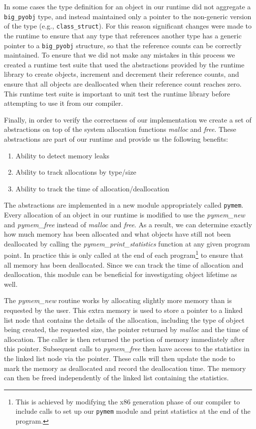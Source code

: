 \documentclass{sigplanconf}
\newcommand{\afunction}[1]{\textit{#1}}
\newcommand{\atype}[1]{\texttt{#1}}
\begin{document}
In some cases the type definition for an object in our runtime did not aggregate a \atype{big\_pyobj} type, and instead maintained only a pointer to the non-generic version of the type (e.g., \atype{class\_struct}).  For this reason significant changes were made to the runtime to ensure that any type that references another type has a generic pointer to a \atype{big\_pyobj} structure, so that the reference counts can be correctly maintained.  To ensure that we did not make any mistakes in this process we created a runtime test suite that used the abstractions provided by the runtime library to create objects, increment and decrement their reference counts, and ensure that all objects are deallocated when their reference count reaches zero.  This runtime test suite is important to unit test the runtime library before attempting to use it from our compiler.

Finally, in order to verify the correctness of our implementation we create a set of abstractions on top of the system allocation functions \afunction{malloc} and \afunction{free}.  These abstractions are part of our runtime and provide us the following benefits: 

\begin{enumerate}
\item Ability to detect memory leaks
\item Ability to track allocations by type/size
\item Ability to track the time of allocation/deallocation
\end{enumerate}

The abstractions are implemented in a new module appropriately called \texttt{pymem}.  Every allocation of an object in our runtime is modified to use the \afunction{pymem\_new} and \afunction{pymem\_free} instead of \afunction{malloc} and \afunction{free}. As a result, we can determine exactly how much memory has been allocated and what objects have still not been deallocated by calling the \afunction{pymem\_print\_statistics} function at any given program point.  In practice this is only called at the end of each program\footnote{This is achieved by modifying the x86 generation phase of our compiler to include calls to set up our \texttt{pymem} module and print statistics at the end of the program. } to ensure that all memory has been deallocated.  Since we can track the time of allocation and deallocation, this module can be beneficial for investigating object lifetime as well.  

The \afunction{pymem\_new} routine works by allocating slightly more memory than is requested by the user.  This extra memory is used to store a pointer to a linked list node that contains the details of the allocation, including the type of object being created, the requested size, the pointer returned by \afunction{malloc} and the time of allocation.  The caller is then returned the portion of memory immediately after this pointer.  Subsequent calls to \afunction{pymem\_free} then have access to the statistics in the linked list node via the pointer.  These calls will then update the node to mark the memory as deallocated and record the deallocation time.  The memory can then be freed independently of the linked list containing the statistics. 
\end{document}
